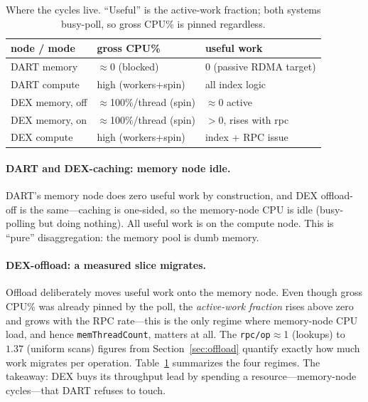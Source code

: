 \documentclass[sigconf,nonacm]{acmart}
\begin{document}
\begin{table}[t]
  \centering
  \caption{Where the cycles live. ``Useful'' is the active-work fraction; both
  systems busy-poll, so gross CPU\% is pinned regardless.}
  \label{tab:cycles}
  \small
  \begin{tabular}{lll}
    \toprule
    node / mode & gross CPU\% & useful work \\
    \midrule
    DART memory          & $\approx$0 (blocked) & 0 (passive RDMA target) \\
    DART compute         & high (workers+spin)  & all index logic \\
    DEX memory, off      & $\approx$100\%/thread (spin) & $\approx$0 active \\
    DEX memory, on       & $\approx$100\%/thread (spin) & $>$0, rises with rpc \\
    DEX compute          & high (workers+spin)  & index + RPC issue \\
    \bottomrule
  \end{tabular}
\end{table}

\paragraph{DART and DEX-caching: memory node idle.}
DART's memory node does zero useful work by construction, and DEX offload-off is
the same---caching is one-sided, so the memory-node CPU is idle (busy-polling but
doing nothing). All useful work is on the compute node. This is ``pure''
disaggregation: the memory pool is dumb memory.

\paragraph{DEX-offload: a measured slice migrates.}
Offload deliberately moves useful work onto the memory node. Even though gross
CPU\% was already pinned by the poll, the \emph{active-work fraction} rises above
zero and grows with the RPC rate---this is the only regime where memory-node CPU
load, and hence \texttt{memThreadCount}, matters at all. The
\texttt{rpc/op}$\approx$1 (lookups) to $1.37$ (uniform scans) figures from
Section~\ref{sec:offload} quantify exactly how much work migrates per operation.
Table~\ref{tab:cycles} summarizes the four regimes. The takeaway: DEX buys its
throughput lead by spending a resource---memory-node cycles---that DART refuses
to touch.

\end{document}
